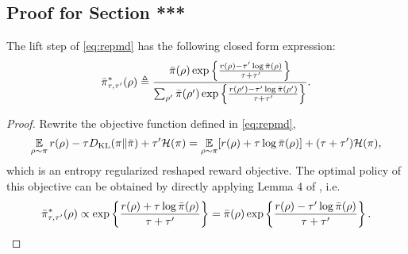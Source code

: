 \subsection{Proof for Section ***}
\begin{lem}
	\label{lem:opt_pi_ref}
	The lift step of \cref{eq:repmd} has the following closed form expression:
	\begin{equation*}
	\bar{\pi}_{\tau,\tau^{\prime}}^*(\rho) \triangleq \frac{\bar{\pi}(\rho) \exp\left\{ \frac{r(\rho)-\tau^{\prime} \log \bar{\pi}(\rho) }{ \tau+\tau^{\prime}} \right\}}{ \sum_{\rho^{\prime}}{\bar{\pi}(\rho^{\prime}) \exp\left\{ \frac{r(\rho^{\prime})-\tau^{\prime} \log \bar{\pi}(\rho^{\prime})}{ \tau+\tau^{\prime}} \right\} } }.
	\end{equation*}
\end{lem}
\begin{proof}
	Rewrite the objective function defined in \cref{eq:repmd},
	\begin{equation}
	\operatorname*{\mathbb{E}}\limits_{\rho \sim \pi} r(\rho)  - \tau D_{\mathrm{KL}}(\pi \| \bar{\pi}) + \tau^{\prime} \mathcal{H}(\pi) = \operatorname*{\mathbb{E}}\limits_{\rho \sim \pi} [r(\rho) + \tau \log \bar{\pi}(\rho)] + (\tau+\tau^{\prime}) \mathcal{H}(\pi),
	\end{equation}
	which is an entropy regularized reshaped reward objective. The optimal policy of this objective can be obtained by directly applying Lemma 4 of \citet{nachum2017bridging}, i.e.
	\begin{equation}
	\label{pi_bar_star_tau_tauprime_prop_form}
	\bar{\pi}_{\tau,\tau^{\prime}}^*(\rho)\propto \exp\left\{ \frac{r(\rho)+\tau \log \bar{\pi}(\rho)}{\tau+\tau^{\prime}} \right\} = \bar{\pi}(\rho) \exp\left\{ \frac{r(\rho)-\tau^{\prime} \log \bar{\pi}(\rho)}{\tau+\tau^{\prime}} \right\}. \qedhere
	\end{equation}
\end{proof}

